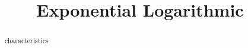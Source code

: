 \documentclass{ximera}
\title{Exponential Logarithmic}
\begin{document}
\begin{abstract}
characteristics
\end{abstract}
\maketitle
\end{document}
